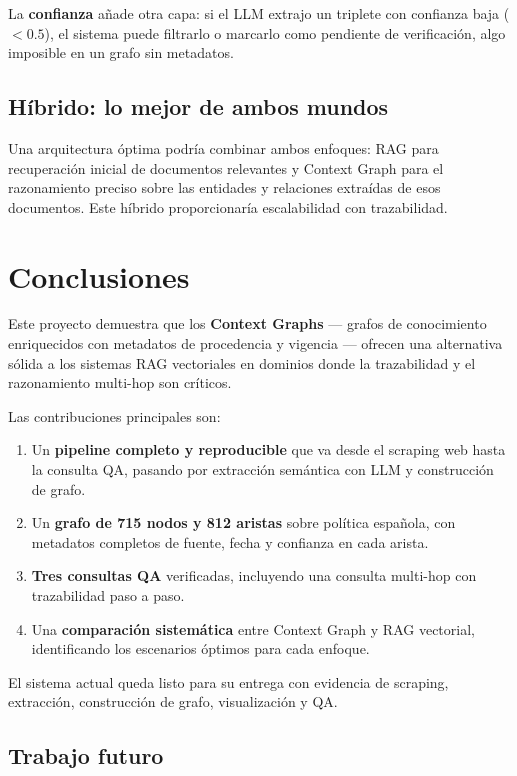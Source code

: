 \documentclass[12pt,a4paper]{article}
\begin{document}
La \textbf{confianza} añade otra capa: si el LLM extrajo un triplete con confianza baja ($< 0.5$), el sistema puede filtrarlo o marcarlo como pendiente de verificación, algo imposible en un grafo sin metadatos.

\subsection{Híbrido: lo mejor de ambos mundos}

Una arquitectura óptima podría combinar ambos enfoques: RAG para recuperación inicial de documentos relevantes y Context Graph para el razonamiento preciso sobre las entidades y relaciones extraídas de esos documentos. Este híbrido proporcionaría escalabilidad con trazabilidad.

\section{Conclusiones}
\label{sec:conclusiones}

Este proyecto demuestra que los \textbf{Context Graphs} --- grafos de conocimiento enriquecidos con metadatos de procedencia y vigencia --- ofrecen una alternativa sólida a los sistemas RAG vectoriales en dominios donde la trazabilidad y el razonamiento multi-hop son críticos.

Las contribuciones principales son:

\begin{enumerate}
  \item Un \textbf{pipeline completo y reproducible} que va desde el scraping web hasta la consulta QA, pasando por extracción semántica con LLM y construcción de grafo.
  \item Un \textbf{grafo de 715 nodos y 812 aristas} sobre política española, con metadatos completos de fuente, fecha y confianza en cada arista.
  \item \textbf{Tres consultas QA} verificadas, incluyendo una consulta multi-hop con trazabilidad paso a paso.
  \item Una \textbf{comparación sistemática} entre Context Graph y RAG vectorial, identificando los escenarios óptimos para cada enfoque.
\end{enumerate}

El sistema actual queda listo para su entrega con evidencia de scraping, extracción, construcción de grafo, visualización y QA.

\subsection*{Trabajo futuro}
\end{document}
